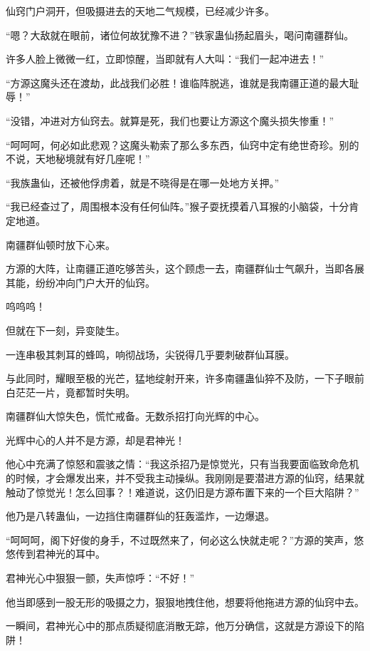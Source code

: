 
\begin{this_body}

仙窍门户洞开，但吸摄进去的天地二气规模，已经减少许多。

“嗯？大敌就在眼前，诸位何故犹豫不进？”铁家蛊仙扬起眉头，喝问南疆群仙。

许多人脸上微微一红，立即惊醒，当即就有人大叫：“我们一起冲进去！”

“方源这魔头还在渡劫，此战我们必胜！谁临阵脱逃，谁就是我南疆正道的最大耻辱！”

“没错，冲进对方仙窍去。就算是死，我们也要让方源这个魔头损失惨重！”

“呵呵呵，何必如此悲观？这魔头勒索了那么多东西，仙窍中定有绝世奇珍。别的不说，天地秘境就有好几座呢！”

“我族蛊仙，还被他俘虏着，就是不晓得是在哪一处地方关押。”

“我已经查过了，周围根本没有任何仙阵。”猴子耍抚摸着八耳猴的小脑袋，十分肯定地道。

南疆群仙顿时放下心来。

方源的大阵，让南疆正道吃够苦头，这个顾虑一去，南疆群仙士气飙升，当即各展其能，纷纷冲向门户大开的仙窍。

呜呜呜！

但就在下一刻，异变陡生。

一连串极其刺耳的蜂鸣，响彻战场，尖锐得几乎要刺破群仙耳膜。

与此同时，耀眼至极的光芒，猛地绽射开来，许多南疆蛊仙猝不及防，一下子眼前白茫茫一片，竟都暂时失明。

南疆群仙大惊失色，慌忙戒备。无数杀招打向光辉的中心。

光辉中心的人并不是方源，却是君神光！

他心中充满了惊怒和震骇之情：“我这杀招乃是惊觉光，只有当我要面临致命危机的时候，才会爆发出来，并不受我主动操纵。我刚刚是要潜进方源的仙窍，结果就触动了惊觉光！怎么回事？！难道说，这仍旧是方源布置下来的一个巨大陷阱？”

他乃是八转蛊仙，一边挡住南疆群仙的狂轰滥炸，一边爆退。

“呵呵呵，阁下好俊的身手，不过既然来了，何必这么快就走呢？”方源的笑声，悠悠传到君神光的耳中。

君神光心中狠狠一颤，失声惊呼：“不好！”

他当即感到一股无形的吸摄之力，狠狠地拽住他，想要将他拖进方源的仙窍中去。

一瞬间，君神光心中的那点质疑彻底消散无踪，他万分确信，这就是方源设下的陷阱！


\end{this_body}
